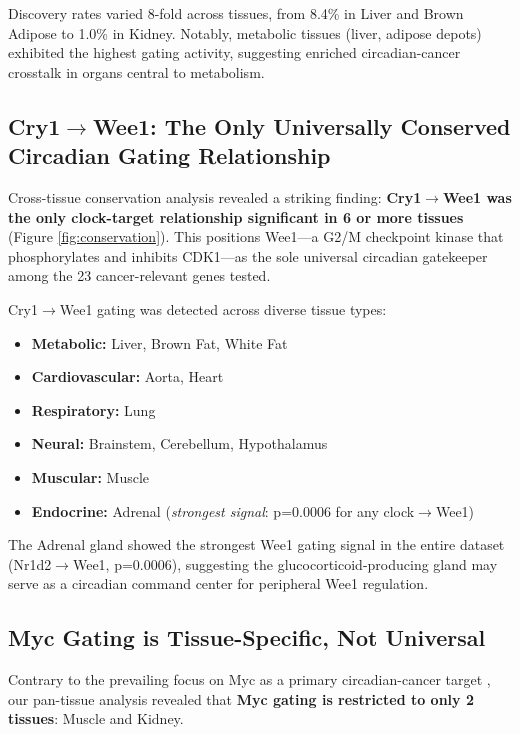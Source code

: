 \documentclass[11pt,letterpaper]{article}
\begin{document}
Discovery rates varied 8-fold across tissues, from 8.4\% in Liver and Brown Adipose to 1.0\% in Kidney. Notably, metabolic tissues (liver, adipose depots) exhibited the highest gating activity, suggesting enriched circadian-cancer crosstalk in organs central to metabolism.

\subsection{Cry1$\rightarrow$Wee1: The Only Universally Conserved Circadian Gating Relationship}

Cross-tissue conservation analysis revealed a striking finding: \textbf{Cry1$\rightarrow$Wee1 was the only clock-target relationship significant in 6 or more tissues} (Figure \ref{fig:conservation}). This positions Wee1---a G2/M checkpoint kinase that phosphorylates and inhibits CDK1---as the sole universal circadian gatekeeper among the 23 cancer-relevant genes tested.

Cry1$\rightarrow$Wee1 gating was detected across diverse tissue types:
\begin{itemize}[noitemsep]
    \item \textbf{Metabolic:} Liver, Brown Fat, White Fat
    \item \textbf{Cardiovascular:} Aorta, Heart
    \item \textbf{Respiratory:} Lung
    \item \textbf{Neural:} Brainstem, Cerebellum, Hypothalamus
    \item \textbf{Muscular:} Muscle
    \item \textbf{Endocrine:} Adrenal (\textit{strongest signal}: p=0.0006 for any clock$\rightarrow$Wee1)
\end{itemize}

The Adrenal gland showed the strongest Wee1 gating signal in the entire dataset (Nr1d2$\rightarrow$Wee1, p=0.0006), suggesting the glucocorticoid-producing gland may serve as a circadian command center for peripheral Wee1 regulation.

\subsection{Myc Gating is Tissue-Specific, Not Universal}

Contrary to the prevailing focus on Myc as a primary circadian-cancer target \citep{altman2015}, our pan-tissue analysis revealed that \textbf{Myc gating is restricted to only 2 tissues}: Muscle and Kidney.
\end{document}
